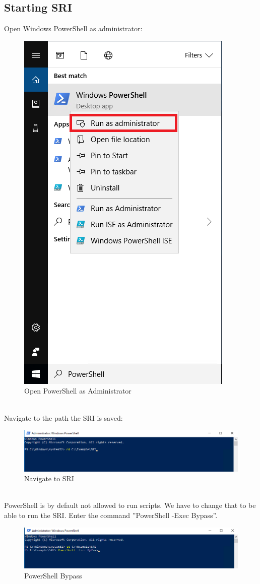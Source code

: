 
\thispagestyle{plain}
\renewcommand\section{\stdsection}
\setcounter{section}{4}
\subsection{Starting SRI}
Open Windows PowerShell as administrator:

\begin{figure}[H]
    \centering
    \includegraphics[width=0.35\linewidth]{assets/ps_admin.png}
    \caption{Open PowerShell as Administrator}
\end{figure} \ \\
Navigate to the path the SRI is saved:
\begin{figure}[H]
    \centering
    \includegraphics[width=1\linewidth]{assets/open_sri.png}
    \caption{Navigate to SRI}
\end{figure} \ \\
PowerShell is by default not allowed to run scripts. We have to change that to be able to run the SRI. Enter the command ''PowerShell -Exec Bypass''.
\begin{figure}[H]
    \centering
    \includegraphics[width=1\linewidth]{assets/ps_bypass.png}
    \caption{PowerShell Bypass}
\end{figure} \ \\
